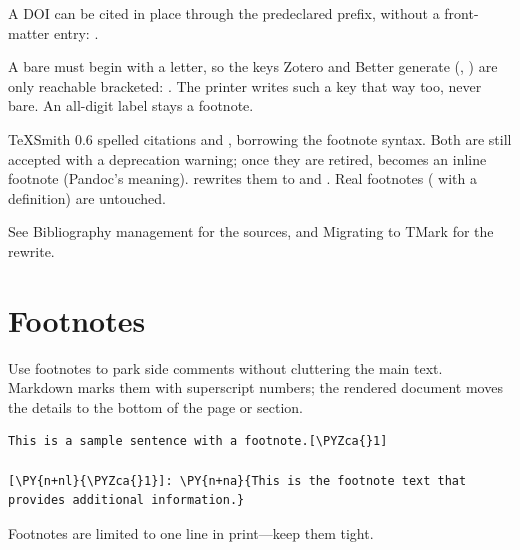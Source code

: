 \documentclass[a4paper,twoside]{article}
\begin{document}
A DOI can be cited in place through the predeclared  prefix, without a
front-matter entry: .
\begin{tscallout}[kind=note, title={A key that starts with a digit needs the brackets}]
A bare  must begin with a letter, so the keys Zotero and Better
 generate (, ) are only reachable bracketed:
. The printer writes such a key that way too, never bare. An
all-digit label stays a footnote.
\end{tscallout}
\begin{tscallout}[kind=note, title={The footnote spelling of a citation is deprecated}]
TeXSmith 0.6 spelled citations \tscodeinline{[\^{}key]} and \tscodeinline{\^{}[k1,k2]}, borrowing the
footnote syntax. Both are still accepted with a deprecation warning; once
they are retired, \tscodeinline{\^{}[…]} becomes an inline footnote (Pandoc's meaning).
 rewrites them to  and . Real footnotes
(\tscodeinline{[\^{}1]} with a definition) are untouched.
\end{tscallout}
See Bibliography management for the
sources, and Migrating to TMark for the rewrite.
\section{Footnotes}
Use footnotes to park side comments without cluttering the main text. Markdown marks them with superscript numbers; the rendered document moves the details to the bottom of the page or section.
\begin{tscode}[lang=md, engine=pygments]
\begin{Verbatim}[commandchars=\\\{\},breaklines, breakanywhere, commandchars=\\\{\}]
This is a sample sentence with a footnote.[\PYZca{}1]

[\PY{n+nl}{\PYZca{}1}]: \PY{n+na}{This is the footnote text that provides additional information.}
\end{Verbatim}
\end{tscode}
Footnotes are limited to one line in print---keep them tight.
\end{document}
